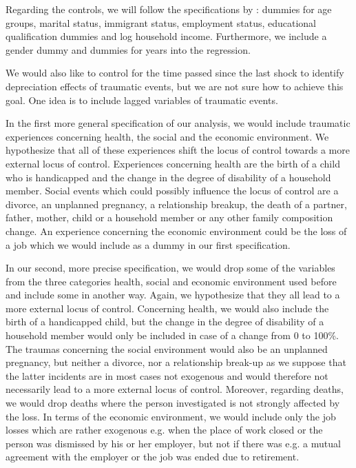 \documentclass{scrartcl}
\begin{document}
Regarding the controls, we will follow the specifications by \citet{cobb2013}:
dummies for age groups, marital status, immigrant status, employment status,
educational qualification dummies and log household income. Furthermore, we
include a gender dummy and dummies for years into the regression.

We would also like to control for the time passed since the last shock to
identify depreciation effects of traumatic events, but we are not sure how to
achieve this goal. One idea is to include lagged variables of traumatic events.

In the first more general specification of our analysis, we would include
traumatic experiences concerning health, the social and the economic
environment. We hypothesize that all of these experiences shift the locus of
control towards a more external locus of control. Experiences concerning health
are the birth of a child who is handicapped and the change in the degree of
disability of a household member. Social events which could possibly influence
the locus of control are a divorce, an unplanned pregnancy, a relationship
breakup, the death of a partner, father, mother, child or a household member or
any other family composition change. An experience concerning the economic
environment could be the loss of a job which we would include as a dummy in our
first specification.

In our second, more precise specification, we would drop some of the variables
from the three categories health, social and economic environment used before
and include some in another way. Again, we hypothesize that they all lead to a
more external locus of control. Concerning health, we would also include the
birth of a handicapped child, but the change in the degree of disability of a
household member would only be included in case of a change from 0 to 100\%.
The traumas concerning the social environment would also be an unplanned
pregnancy, but neither a divorce, nor a relationship break-up as we suppose
that the latter incidents are in most cases not exogenous and would therefore
not necessarily lead to a more external locus of control. Moreover, regarding
deaths, we would drop deaths where the person investigated is not strongly
affected by the loss. In terms of the economic environment, we would include
only the job losses which are rather exogenous e.g. when the place of work
closed or the person was dismissed by his or her employer, but not if there was
e.g. a mutual agreement with the employer or the job was ended due to
retirement.
\end{document}
